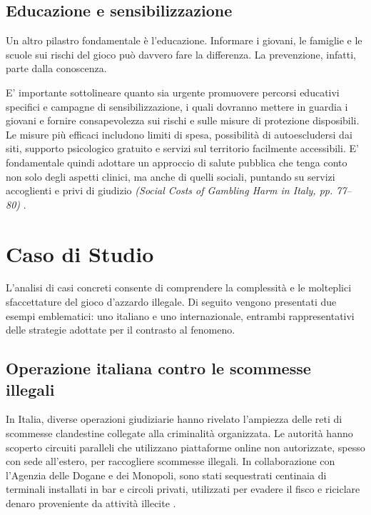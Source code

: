 \documentclass[a4paper,12pt]{article}
\begin{document}
\subsection{Educazione e sensibilizzazione}

Un altro pilastro fondamentale è l’educazione. Informare i giovani, le famiglie e le scuole sui rischi del gioco può davvero fare la differenza. La prevenzione, infatti, parte dalla conoscenza.

E' importante sottolineare quanto sia urgente promuovere percorsi educativi specifici e campagne di sensibilizzazione, i quali dovranno mettere in guardia i giovani e fornire consapevolezza sui rischi e sulle misure di protezione disposibili. Le misure più efficaci includono limiti di spesa, possibilità di autoescludersi dai siti, supporto psicologico gratuito e servizi sul territorio facilmente accessibili. E' fondamentale quindi adottare un approccio di salute pubblica che tenga conto non solo degli aspetti clinici, ma anche di quelli sociali, puntando su servizi accoglienti e privi di giudizio \textit{(Social Costs of Gambling Harm in Italy, pp. 77--80)} \cite{lucchini2022socialcosts}.

\section{Caso di Studio}

L’analisi di casi concreti consente di comprendere la complessità e le molteplici sfaccettature del gioco d’azzardo illegale. Di seguito vengono presentati due esempi emblematici: uno italiano e uno internazionale, entrambi rappresentativi delle strategie adottate per il contrasto al fenomeno.

\subsection{Operazione italiana contro le scommesse illegali}
In Italia, diverse operazioni giudiziarie hanno rivelato l’ampiezza delle reti di scommesse clandestine collegate alla criminalità organizzata. Le autorità hanno scoperto circuiti paralleli che utilizzano piattaforme online non autorizzate, spesso con sede all’estero, per raccogliere scommesse illegali. In collaborazione con l’Agenzia delle Dogane e dei Monopoli, sono stati sequestrati centinaia di terminali installati in bar e circoli privati, utilizzati per evadere il fisco e riciclare denaro proveniente da attività illecite \cite{lucchini2022socialcosts}.
\end{document}
